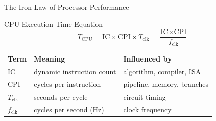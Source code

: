 \documentclass[aspectratio=169,11pt,t]{beamer}
\begin{document}
\begin{frame}{The Iron Law of Processor Performance}
\begin{block}{CPU Execution-Time Equation}
\[
T_{\text{CPU}}
=
\text{IC}\times\text{CPI}\times T_{\text{clk}}
=
\frac{\text{IC}\times\text{CPI}}{f_{\text{clk}}}
\]
\end{block}
\vspace{0.1cm}
\begin{center}
\small
\renewcommand{\arraystretch}{1.15}
\begin{tabular}{
>{\raggedright\arraybackslash}m{2.2cm}
>{\raggedright\arraybackslash}m{3.6cm}
>{\raggedright\arraybackslash}m{5.4cm}
}
\rowcolor{navy}
{\color{white}\bfseries Term} &
{\color{white}\bfseries Meaning} &
{\color{white}\bfseries Influenced by} \\
\rowcolor{softgray}
IC &
dynamic instruction count &
algorithm, compiler, ISA \\
\rowcolor{white}
CPI &
cycles per instruction &
pipeline, memory, branches \\
\rowcolor{softgray}
$T_{\text{clk}}$ &
seconds per cycle &
circuit timing \\
\rowcolor{white}
$f_{\text{clk}}$ &
cycles per second (Hz) &
clock frequency \\
\end{tabular}
\end{center}
\end{frame}










\end{document}
